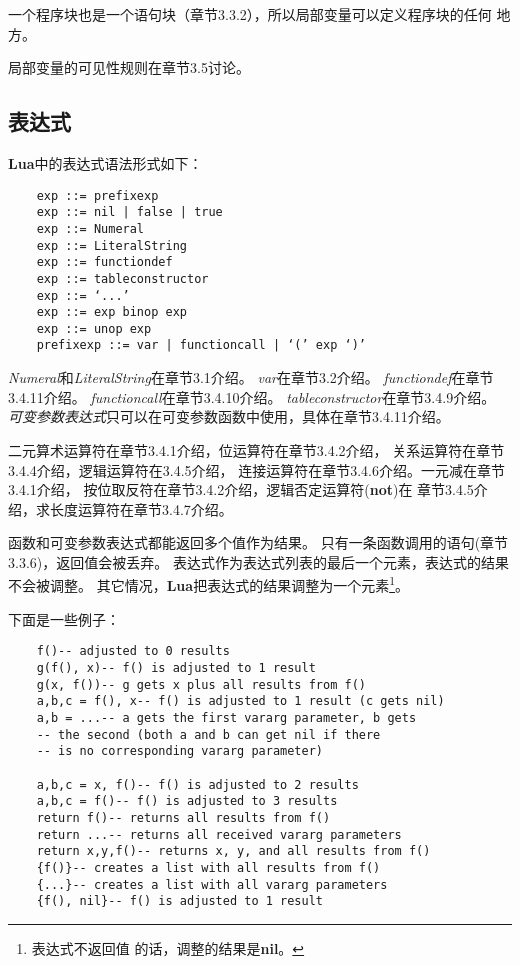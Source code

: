 \documentclass{ctexart}
\begin{document}
一个程序块也是一个语句块（章节3.3.2），所以局部变量可以定义程序块的任何
地方。

局部变量的可见性规则在章节3.5讨论。

\subsection{表达式}

\textbf{Lua}中的表达式语法形式如下：

\lstset{language=C}
\begin{lstlisting}
	exp ::= prefixexp
	exp ::= nil | false | true
	exp ::= Numeral
	exp ::= LiteralString
	exp ::= functiondef
	exp ::= tableconstructor
	exp ::= ‘...’
	exp ::= exp binop exp
	exp ::= unop exp
	prefixexp ::= var | functioncall | ‘(’ exp ‘)’
\end{lstlisting}

\emph{Numeral}和\emph{LiteralString}在章节3.1介绍。
\emph{var}在章节3.2介绍。
\emph{functiondef}在章节3.4.11介绍。
\emph{functioncall}在章节3.4.10介绍。
\emph{tableconstructor}在章节3.4.9介绍。
\emph{可变参数表达式}只可以在可变参数函数中使用，具体在章节3.4.11介绍。

二元算术运算符在章节3.4.1介绍，位运算符在章节3.4.2介绍，
关系运算符在章节3.4.4介绍，逻辑运算符在3.4.5介绍，
连接运算符在章节3.4.6介绍。一元减在章节3.4.1介绍，
按位取反符在章节3.4.2介绍，逻辑否定运算符(\textbf{not})在
章节3.4.5介绍，求长度运算符在章节3.4.7介绍。

函数和可变参数表达式都能返回多个值作为结果。
只有一条函数调用的语句(章节3.3.6)，返回值会被丢弃。
表达式作为表达式列表的最后一个元素，表达式的结果不会被调整。
其它情况，\textbf{Lua}把表达式的结果调整为一个元素\footnote{表达式不返回值
的话，调整的结果是\textbf{nil}。}。

下面是一些例子：

\lstset{language=C}
\begin{lstlisting}
	f()-- adjusted to 0 results
	g(f(), x)-- f() is adjusted to 1 result
	g(x, f())-- g gets x plus all results from f()
	a,b,c = f(), x-- f() is adjusted to 1 result (c gets nil)
	a,b = ...-- a gets the first vararg parameter, b gets
	-- the second (both a and b can get nil if there
	-- is no corresponding vararg parameter)
     
	a,b,c = x, f()-- f() is adjusted to 2 results
	a,b,c = f()-- f() is adjusted to 3 results
	return f()-- returns all results from f()
	return ...-- returns all received vararg parameters
	return x,y,f()-- returns x, y, and all results from f()
	{f()}-- creates a list with all results from f()
	{...}-- creates a list with all vararg parameters
	{f(), nil}-- f() is adjusted to 1 result
\end{lstlisting}
\end{document}
